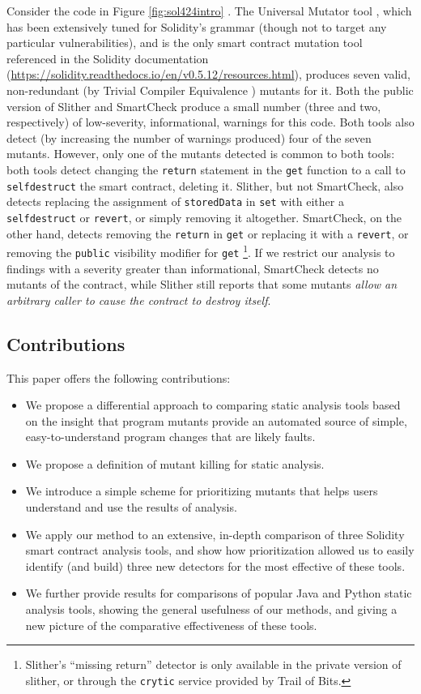 Consider the code in Figure \ref{fig:sol424intro} \cite{solintro}.  The Universal Mutator tool \cite{universalmutator,regexpMut}, which has been extensively tuned for Solidity's grammar (though not to target any particular vulnerabilities), and is the only smart contract mutation tool referenced in the Solidity documentation (\url{https://solidity.readthedocs.io/en/v0.5.12/resources.html}), produces seven valid, non-redundant (by Trivial Compiler Equivalence \cite{TCE}) mutants for it.  Both the public version of Slither \cite{slither} and SmartCheck \cite{smartcheck} produce a small number (three and two, respectively) of low-severity, informational, warnings for this code.  Both tools also detect (by increasing the number of warnings produced) four of the seven mutants.  However, only one of the mutants detected is common to both tools: both tools detect changing the {\tt return} statement in the {\tt get} function to a call to {\tt selfdestruct} the smart contract, deleting it.  Slither, but not SmartCheck, also detects replacing the assignment of {\tt storedData} in {\tt set} with either a {\tt selfdestruct} or {\tt revert}, or simply removing it altogether.  SmartCheck, on the other hand, detects removing the {\tt return} in {\tt get} or replacing it with a {\tt revert}, or removing the {\tt public} visibility modifier for {\tt get} \footnote{Slither's ``missing return'' detector is only available in the private version of slither, or through the {\tt crytic} service provided by Trail of Bits.}.  If we restrict our analysis to findings with a severity greater than informational, SmartCheck detects no mutants of the contract, while Slither still reports that some mutants \emph{allow an arbitrary caller to cause the contract to destroy itself}.  

\subsection{Contributions}

This paper offers the following contributions:

\begin{itemize}[labelsep=3pt,leftmargin=12pt]
\item We propose a differential approach to comparing static analysis tools based on the insight that program mutants provide an automated source of simple, easy-to-understand program changes that are likely faults.
\item We propose a definition of mutant killing for static analysis.
\item We introduce a simple scheme for prioritizing mutants that helps users understand and use the results of analysis.
\item We apply our method to an extensive, in-depth comparison of three Solidity smart contract analysis tools, and show how prioritization allowed us to easily identify (and build) three new detectors for the most effective of these tools.
\item We further provide results for comparisons of popular Java and Python static analysis tools, showing the general usefulness of our methods, and giving a new picture of the comparative effectiveness of these tools.
\end{itemize}

